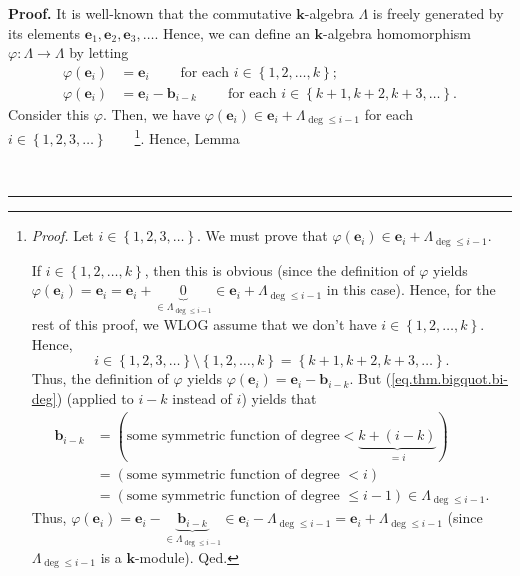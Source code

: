 \documentclass[numbers=enddot,12pt,final,onecolumn,notitlepage]{scrartcl}%
\theoremstyle{definition}
\newenvironment{proof}[1][Proof]{\noindent\textbf{#1.} }{\ \rule{0.5em}{0.5em}}
\begin{document}
\begin{proof}
It is well-known that the commutative $\mathbf{k}$-algebra $\Lambda$ is freely
generated by its elements $\mathbf{e}_{1},\mathbf{e}_{2},\mathbf{e}_{3}%
,\ldots$. Hence, we can define an $\mathbf{k}$-algebra homomorphism
$\varphi:\Lambda\rightarrow\Lambda$ by letting%
\begin{align}
\varphi\left(  \mathbf{e}_{i}\right)   &  =\mathbf{e}_{i}%
\ \ \ \ \ \ \ \ \ \ \text{for each }i\in\left\{  1,2,\ldots,k\right\}
;\label{pf.thm.bigquot.phi1}\\
\varphi\left(  \mathbf{e}_{i}\right)   &  =\mathbf{e}_{i}-\mathbf{b}%
_{i-k}\ \ \ \ \ \ \ \ \ \ \text{for each }i\in\left\{  k+1,k+2,k+3,\ldots
\right\}  . \label{pf.thm.bigquot.phi2}%
\end{align}
Consider this $\varphi$. Then, we have $\varphi\left(  \mathbf{e}_{i}\right)
\in\mathbf{e}_{i}+\Lambda_{\deg\leq i-1}$ for each $i\in\left\{
1,2,3,\ldots\right\}  $\ \ \ \ \footnote{\textit{Proof.} Let $i\in\left\{
1,2,3,\ldots\right\}  $. We must prove that $\varphi\left(  \mathbf{e}%
_{i}\right)  \in\mathbf{e}_{i}+\Lambda_{\deg\leq i-1}$.
\par
If $i\in\left\{  1,2,\ldots,k\right\}  $, then this is obvious (since the
definition of $\varphi$ yields $\varphi\left(  \mathbf{e}_{i}\right)
=\mathbf{e}_{i}=\mathbf{e}_{i}+\underbrace{0}_{\in\Lambda_{\deg\leq i-1}}%
\in\mathbf{e}_{i}+\Lambda_{\deg\leq i-1}$ in this case). Hence, for the rest
of this proof, we WLOG assume that we don't have $i\in\left\{  1,2,\ldots
,k\right\}  $. Hence,%
\[
i\in\left\{  1,2,3,\ldots\right\}  \setminus\left\{  1,2,\ldots,k\right\}
=\left\{  k+1,k+2,k+3,\ldots\right\}  .
\]
Thus, the definition of $\varphi$ yields $\varphi\left(  \mathbf{e}%
_{i}\right)  =\mathbf{e}_{i}-\mathbf{b}_{i-k}$. But
(\ref{eq.thm.bigquot.bi-deg}) (applied to $i-k$ instead of $i$) yields that
\begin{align*}
\mathbf{b}_{i-k}  &  =\left(  \text{some symmetric function of degree
}<\underbrace{k+\left(  i-k\right)  }_{=i}\right) \\
&  =\left(  \text{some symmetric function of degree }<i\right) \\
&  =\left(  \text{some symmetric function of degree }\leq i-1\right)
\in\Lambda_{\deg\leq i-1}.
\end{align*}
Thus, $\varphi\left(  \mathbf{e}_{i}\right)  =\mathbf{e}_{i}%
-\underbrace{\mathbf{b}_{i-k}}_{\in\Lambda_{\deg\leq i-1}}\in\mathbf{e}%
_{i}-\Lambda_{\deg\leq i-1}=\mathbf{e}_{i}+\Lambda_{\deg\leq i-1}$ (since
$\Lambda_{\deg\leq i-1}$ is a $\mathbf{k}$-module). Qed.}. Hence, Lemma

\end{proof}
\end{document}

